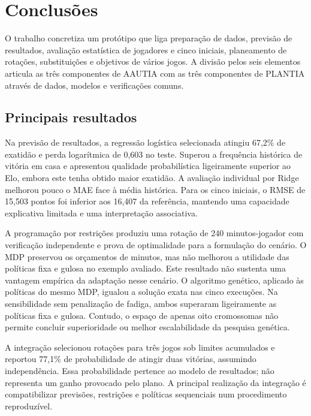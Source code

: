 \chapter{Conclusões}
\label{chap:conclusoes}

O trabalho concretiza um protótipo que liga preparação de dados, previsão
de resultados, avaliação estatística de jogadores e cinco iniciais,
planeamento de rotações, substituições e objetivos de vários jogos.
A divisão pelos seis elementos articula as três componentes de AAUTIA
com as três componentes de PLANTIA através de dados, modelos e verificações
comuns.

\section{Principais resultados}

Na previsão de resultados, a regressão logística selecionada atingiu
67,2\% de exatidão e perda logarítmica de 0,603 no teste. Superou a
frequência histórica de vitória em casa e apresentou qualidade
probabilística ligeiramente superior ao Elo, embora este tenha obtido
maior exatidão. A avaliação individual por Ridge melhorou pouco o MAE
face à média histórica. Para os cinco iniciais, o RMSE de 15,503 pontos
foi inferior aos 16,407 da referência, mantendo uma capacidade explicativa
limitada e uma interpretação associativa.

A programação por restrições produziu uma rotação de 240 minutos-jogador
com verificação independente e prova de optimalidade para a formulação
do cenário. O MDP preservou os orçamentos de minutos, mas não melhorou a
utilidade das políticas fixa e gulosa no exemplo avaliado. Este resultado
não sustenta uma vantagem empírica da adaptação nesse cenário.
O algoritmo genético, aplicado às políticas do mesmo MDP, igualou a solução
exata nas cinco execuções. Na sensibilidade sem penalização de fadiga,
ambos superaram ligeiramente as políticas fixa e gulosa. Contudo, o espaço
de apenas oito cromossomas não permite concluir superioridade ou melhor
escalabilidade da pesquisa genética.

A integração selecionou rotações para três jogos sob limites acumulados
e reportou 77,1\% de probabilidade de atingir duas vitórias, assumindo
independência. Essa probabilidade pertence ao modelo de resultados;
não representa um ganho provocado pelo plano. A principal realização da
integração é compatibilizar previsões, restrições e políticas sequenciais
num procedimento reproduzível.

